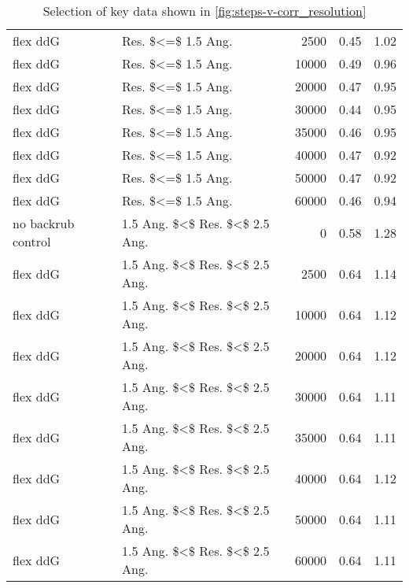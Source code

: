 \begin{table}
\begin{tabular}{llrrr}
           flex ddG &              Res. \$<=\$ 1.5 Ang. &          2500 & 0.45 & 1.02 \\
           flex ddG &              Res. \$<=\$ 1.5 Ang. &         10000 & 0.49 & 0.96 \\
           flex ddG &              Res. \$<=\$ 1.5 Ang. &         20000 & 0.47 & 0.95 \\
           flex ddG &              Res. \$<=\$ 1.5 Ang. &         30000 & 0.44 & 0.95 \\
           flex ddG &              Res. \$<=\$ 1.5 Ang. &         35000 & 0.46 & 0.95 \\
           flex ddG &              Res. \$<=\$ 1.5 Ang. &         40000 & 0.47 & 0.92 \\
           flex ddG &              Res. \$<=\$ 1.5 Ang. &         50000 & 0.47 & 0.92 \\
           flex ddG &              Res. \$<=\$ 1.5 Ang. &         60000 & 0.46 & 0.94 \\
 no backrub control &  1.5 Ang. \$<\$ Res. \$<\$ 2.5 Ang. &             0 & 0.58 & 1.28 \\
           flex ddG &  1.5 Ang. \$<\$ Res. \$<\$ 2.5 Ang. &          2500 & 0.64 & 1.14 \\
           flex ddG &  1.5 Ang. \$<\$ Res. \$<\$ 2.5 Ang. &         10000 & 0.64 & 1.12 \\
           flex ddG &  1.5 Ang. \$<\$ Res. \$<\$ 2.5 Ang. &         20000 & 0.64 & 1.12 \\
           flex ddG &  1.5 Ang. \$<\$ Res. \$<\$ 2.5 Ang. &         30000 & 0.64 & 1.11 \\
           flex ddG &  1.5 Ang. \$<\$ Res. \$<\$ 2.5 Ang. &         35000 & 0.64 & 1.11 \\
           flex ddG &  1.5 Ang. \$<\$ Res. \$<\$ 2.5 Ang. &         40000 & 0.64 & 1.12 \\
           flex ddG &  1.5 Ang. \$<\$ Res. \$<\$ 2.5 Ang. &         50000 & 0.64 & 1.11 \\
           flex ddG &  1.5 Ang. \$<\$ Res. \$<\$ 2.5 Ang. &         60000 & 0.64 & 1.11 \\
\bottomrule
\end{tabular}

\caption[]{Selection of key data shown in \cref{fig:steps-v-corr_resolution}}
\label{tab:steps-v-corr_resolution-underlying-data}
\end{table}

